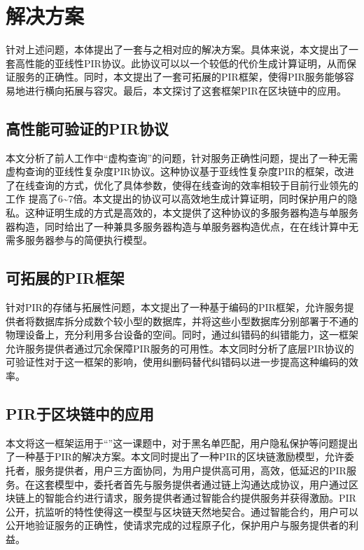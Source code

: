 \section{解决方案}
针对上述问题，本体提出了一套与之相对应的解决方案。具体来说，本文提出了一套高性能的亚线性PIR协议。此协议可以以一个较低的代价生成计算证明，从而保证服务的正确性。同时，本文提出了一套可拓展的PIR框架，使得PIR服务能够容易地进行横向拓展与容灾。最后，本文探讨了这套框架PIR在区块链中的应用。
\subsection{高性能可验证的PIR协议}
本文分析了前人工作中“虚构查询”的问题，针对服务正确性问题，提出了一种无需虚构查询的亚线性复杂度PIR协议。这种协议基于亚线性复杂度PIR的框架，改进了在线查询的方式，优化了具体参数，使得在线查询的效率相较于目前行业领先的工作 \cite{TreePIR,Piano} 提高了6\textasciitilde7倍。本文提出的协议可以高效地生成计算证明，同时保护用户的隐私。这种证明生成的方式是高效的，本文提供了这种协议的多服务器构造与单服务器构造，同时给出了一种兼具多服务器构造与单服务器构造优点，在在线计算中无需多服务器参与的简便执行模型。
\subsection{可拓展的PIR框架}
针对PIR的存储与拓展性问题，本文提出了一种基于编码的PIR框架，允许服务提供者将数据库拆分成数个较小型的数据库，并将这些小型数据库分别部署于不通的物理设备上，充分利用多台设备的空间。同时，通过纠错码的纠错能力，这一框架允许服务提供者通过冗余保障PIR服务的可用性。本文同时分析了底层PIR协议的可验证性对于这一框架的影响，使用纠删码替代纠错码以进一步提高这种编码的效率。

\subsection{PIR于区块链中的应用}
本文将这一框架运用于“\projectname”这一课题中，对于黑名单匹配，用户隐私保护等问题提出了一种基于PIR的解决方案。本文同时提出了一种PIR的区块链激励模型，允许委托者，服务提供者，用户三方面协同，为用户提供高可用，高效，低延迟的PIR服务。在这套模型中，委托者首先与服务提供者通过链上沟通达成协议，用户通过区块链上的智能合约进行请求，服务提供者通过智能合约提供服务并获得激励。PIR公开，抗监听的特性使得这一模型与区块链天然地契合。通过智能合约，用户可以公开地验证服务的正确性，使请求完成的过程原子化，保护用户与服务提供者的利益。